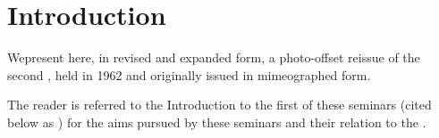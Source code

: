 \chapter*{Introduction} \label{I.0}

We\pageoriginale present here, in revised and expanded form, a photo-offset
reissue of the second , held in 1962 and originally
issued in mimeographed form.

The reader is referred to the Introduction to the first of these seminars
(cited below as ) for the aims pursued by these seminars and their
relation to the .

